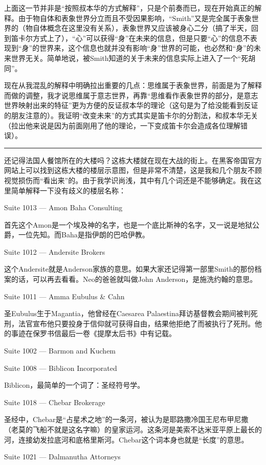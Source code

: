 \documentclass[UTF8]{ctexart}
\newcommand{\myparsep}{\noindent \rule[0.5ex]{\linewidth}{1pt}}
\begin{document}
上面这一节并非是“按照叔本华的方式解释”，只是个前奏而已，现在开始真正的解释。由于物自体和表象世界分立而且不受因果影响，“Smith”又是完全属于表象世界的（物自体概念在这里没有关系），表象世界又应该被身心二分（搞了半天，回到笛卡尔方式上了），“心”可以获得“身”在未来的信息，但是只要“心”的信息不表现到“身”的世界来，这个信息也就并没有影响“身”世界的可能，也必然和“身”的未来世界无关。简单地说，被Smith知道的关于未来的信息实际上进入了一个“死胡同”。

现在从我混乱的解释中明确拉出重要的几点：思维属于表象世界，前面是为了解释而做的调整，我才说思维属于意志世界，再靠“思维看作表象世界的部分，是意志世界映射出来的特征”更为方便的反证叔本华的理论（这句是为了给没能看到反证的朋友注意的）。我证明“改变未来”的方式其实是笛卡尔的分割法，和叔本华无关（拉出他来说是因为前面刚用了他的理论，一下变成笛卡尔会造成各位理解错误）。

\myparsep

还记得法国人餐馆所在的大楼吗？这栋大楼就在现在大战的街上。在黑客帝国官方网站上可以找到这栋大楼的楼层示意图，但是非常不清楚，这是我和几个朋友不顾视觉损伤而“看出来”的。由于我学识尚浅，其中有几个词还是不能够确定。我在这里简单解释一下没有歧义的楼层名称：

Suite 1013 --- Amon Baha Consulting

首先这个Amon是一个埃及神的名字，也是一个底比斯神的名字，又一说是地狱公爵，一位先知。而Baha是指伊朗的巴哈伊教。

Suite 1012 --- Andersite Brokers

这个Andersite就是Anderson家族的意思。如果大家还记得第一部里Smith的那份档案的话，可以再去看看。Neo的爸爸就叫做John Anderson，是施洗约翰的意思。

Suite 1011 --- Amma Eubulus \& Cahn

圣Eubulus生于Magantia，他曾经在Caesarea Palaestina拜访基督教会期间被判死刑，法官宣布他只要投身于信仰就可获得自由，结果他拒绝了而被执行了死刑。他的事迹在保罗书信最后一卷《提摩太后书》中有记载。

Suite 1002 --- Barmon and Kuchem

Suite 1008 --- Biblicon Incorporated

Biblicon，最简单的一个词了：圣经符号学。

Suite 1018 --- Chebar Brokerage

圣经中，Chebar是“占星术之地”的一条河，被认为是耶路撒冷国王尼布甲尼撒（老莫的飞船不就是这名字嘛）的皇家运河。这条河是美索不达米亚平原上最长的河，连接幼发拉底河和底格里斯河。Chebar这个词本身也就是“长度”的意思。

Suite 1021 --- Dalmanutha Attorneys
\end{document}
